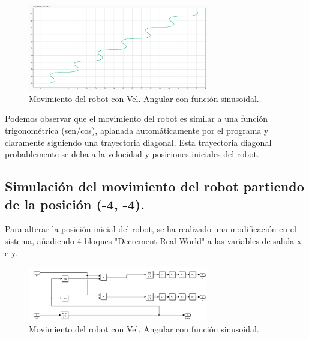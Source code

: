 \documentclass[a4paper, 12pt]{article}
\begin{document}
        \begin{figure}[htp!]
		\centering
		\includegraphics[width=0.7\textwidth]{figures/Movimiento_robot_sinusoidal.png}
		\caption{Movimiento del robot con Vel. Angular con función sinusoidal.}
	\end{figure}
        Podemos observar que el movimiento del robot es similar a una función trigonométrica (sen/cos), aplanada automáticamente por el programa y claramente siguiendo una trayectoria diagonal. Esta trayectoria diagonal probablemente se deba a la velocidad y posiciones iniciales del robot.

    \subsection{Simulación del movimiento del robot partiendo de la posición (-4, -4).}

    Para alterar la posición inicial del robot, se ha realizado una modificación en el sistema, añadiendo 4 bloques "Decrement Real World" a las variables de salida x e y.

    \begin{figure}[htp!]
	\centering
		\includegraphics[width=0.7\textwidth]{figures/SistemaPosicionCambiada.png}
		\caption{Movimiento del robot con Vel. Angular con función sinusoidal.}
	\end{figure}
	
\end{document}
